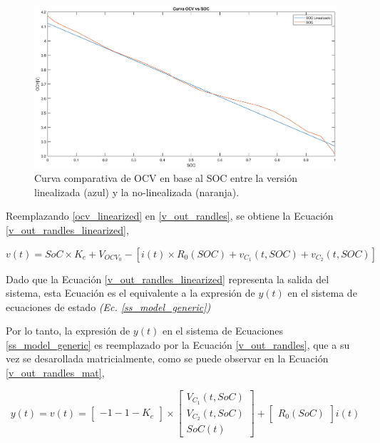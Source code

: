 \documentclass[10pt,a4paper]{article}
\begin{document}
\begin{figure}[h!]
    \begin{center}
	\includegraphics[width=1\textwidth]{SOC_vs_OCV.eps}
    \caption{Curva comparativa de \acrshort{OCV} en base al \acrshort{SOC} 
    entre la versi\'on linealizada (azul) y la no-linealizada (naranja).} 
	\label{soc_linealized}
    \end{center}
\end{figure}
\FloatBarrier

Reemplazando \ref{ocv_linearized} en \ref{v_out_randles}, se obtiene la
Ecuaci\'on \ref{v_out_randles_linearized},

\begin{equation}
    v(t) = SoC \times K_e + V_{OCV_0} - \left[i(t) \times R_0\left(SOC\right) 
        + v_{C_1}\left(t, SOC\right) + v_{C_2}\left(t, SOC\right)\right] 
    \label{v_out_randles_linearized}
\end{equation}

Dado que la Ecuaci\'on \ref{v_out_randles_linearized} representa la salida del 
sistema, esta Ecuaci\'on es el equivalente a la expresi\'on de $y(t)$ en el 
sistema de ecuaciones de estado \emph{(Ec. \ref{ss_model_generic})}

Por lo tanto, la expresi\'on de $y(t)$ en el sistema de Ecuaciones
\ref{ss_model_generic} es reemplazado por la Ecuaci\'on \ref{v_out_randles}, que
a su vez se desarollada matricialmente, como se puede observar en la
Ecuaci\'on \ref{v_out_randles_mat},

\begin{equation}
    y(t) = v(t) = \begin{bmatrix} -1 -1 -K_e \end{bmatrix} \times 
    \begin{bmatrix} V_{C_1}(t, SoC) \\ V_{C_2}(t, SoC) \\ SoC(t) \end{bmatrix} +
    \begin{bmatrix} R_0(SoC) \end{bmatrix} i(t)\label{v_out_randles_mat}
\end{equation}
\end{document}
